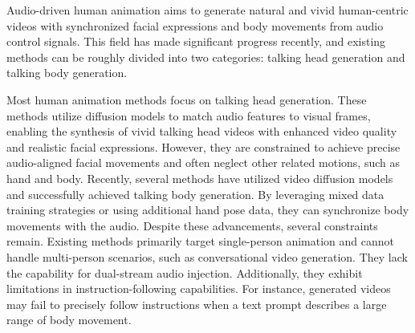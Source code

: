 \documentclass{article}
\begin{document}
Audio-driven human animation aims to generate natural and vivid human-centric videos with synchronized facial expressions and body movements from audio control signals. This field has made significant progress recently, and existing methods can be roughly divided into two categories: talking head generation and talking body generation.

Most human animation methods \cite{tian2024emo,xu2024hallo,cui2024hallo3,chen2025echomimic,li2024latentsync,jiang2024loopy} focus on talking head generation. These methods utilize diffusion models to match audio features to visual frames, enabling the synthesis of vivid talking head videos with enhanced video quality and realistic facial expressions. However, they are constrained to achieve precise audio-aligned facial movements and often neglect other related motions, such as hand and body.
Recently, several methods \cite{lincyberhost,lin2025omnihuman,tian2025emo2,meng2024echomimicv2,wang2025fantasytalking} have utilized video diffusion models \cite{guo2023animatediff,lin2025diffusion,wang2025wan} and successfully achieved talking body generation. By leveraging mixed data training strategies or using additional hand pose data, they can synchronize body movements with the audio.
Despite these advancements, several constraints remain. Existing methods primarily target single-person animation and cannot handle multi-person scenarios, such as conversational video generation. They lack the capability for dual-stream audio injection. Additionally, they exhibit limitations in instruction-following capabilities. For instance, generated videos may fail to precisely follow instructions when a text prompt describes a large range of body movement.
\end{document}
